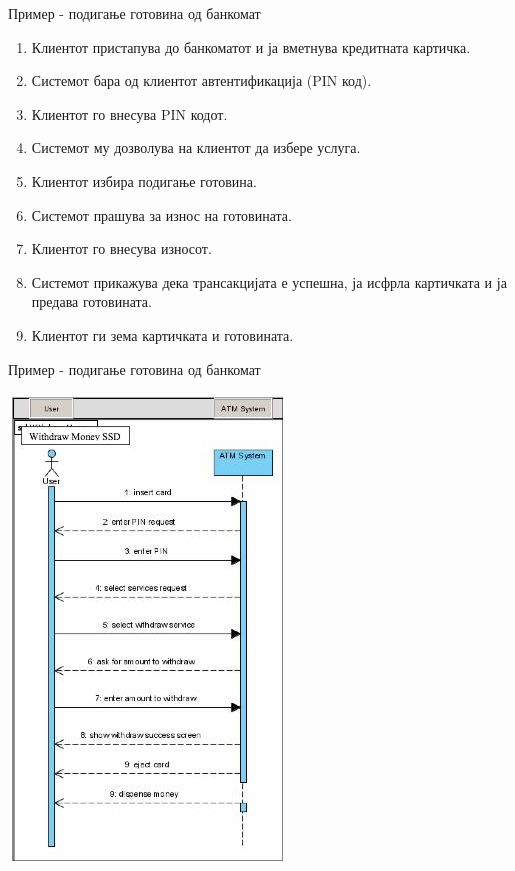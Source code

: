 \begin{frame}{Пример - подигање готовина од банкомат}
\begin{enumerate}
  \item Клиентот пристапува до банкоматот и ја вметнува кредитната картичка.
  \item Системот бара од клиентот автентификација (PIN код).
  \item Клиентот го внесува PIN кодот.
  \item Системот му дозволува на клиентот да избере услуга.
  \item Клиентот избира подигање готовина.
  \item Системот прашува за износ на готовината.
  \item Клиентот го внесува износот.
  \item Системот прикажува дека трансакцијата е успешна, ја исфрла картичката и ја предава готовината.
  \item Клиентот ги зема картичката и готовината.
\end{enumerate}
\end{frame}

\begin{frame}{Пример - подигање готовина од банкомат}
\begin{center}
    \includegraphics[scale=0.4]{images/sequence.jpg}
\end{center}
\end{frame}


